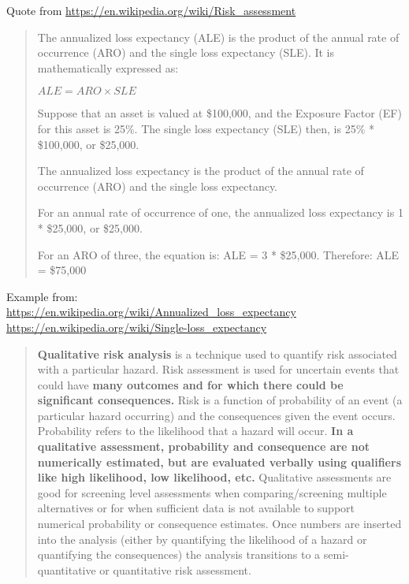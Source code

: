 \documentclass[Screen16to9,17pt]{foils}
\begin{document}
Quote from \url{https://en.wikipedia.org/wiki/Risk_assessment}


\begin{quote}
The annualized loss expectancy (ALE) is the product of the annual rate of occurrence (ARO) and the single loss expectancy (SLE). It is mathematically expressed as:

${\displaystyle {ALE}={ARO}\times {SLE}}$

Suppose that an asset is valued at \$100,000, and the Exposure Factor (EF) for this asset is 25\%. The single loss expectancy (SLE) then, is 25\% * \$100,000, or \$25,000.

The annualized loss expectancy is the product of the annual rate of occurrence (ARO) and the single loss expectancy.

For an annual rate of occurrence of one, the annualized loss expectancy is 1 * \$25,000, or \$25,000.

For an ARO of three, the equation is: ALE = 3 * \$25,000. Therefore: ALE = \$75,000
\end{quote}

Example from:\\
\url{https://en.wikipedia.org/wiki/Annualized_loss_expectancy}\\
\url{https://en.wikipedia.org/wiki/Single-loss_expectancy}


\begin{quote}
  {\bf Qualitative risk analysis} is a technique used to quantify risk associated with a particular hazard. Risk assessment is used for uncertain events that could have {\bf many outcomes and for which there could be significant consequences.} Risk is a function of probability of an event (a particular hazard occurring) and the consequences given the event occurs. Probability refers to the likelihood that a hazard will occur. {\bf In a qualitative assessment, probability and consequence are not numerically estimated, but are evaluated verbally using qualifiers like high likelihood, low likelihood, etc.} Qualitative assessments are good for screening level assessments when comparing/screening multiple alternatives or for when sufficient data is not available to support numerical probability or consequence estimates. Once numbers are inserted into the analysis (either by quantifying the likelihood of a hazard or quantifying the consequences) the analysis transitions to a semi-quantitative or quantitative risk assessment.
\end{quote}
\end{document}
